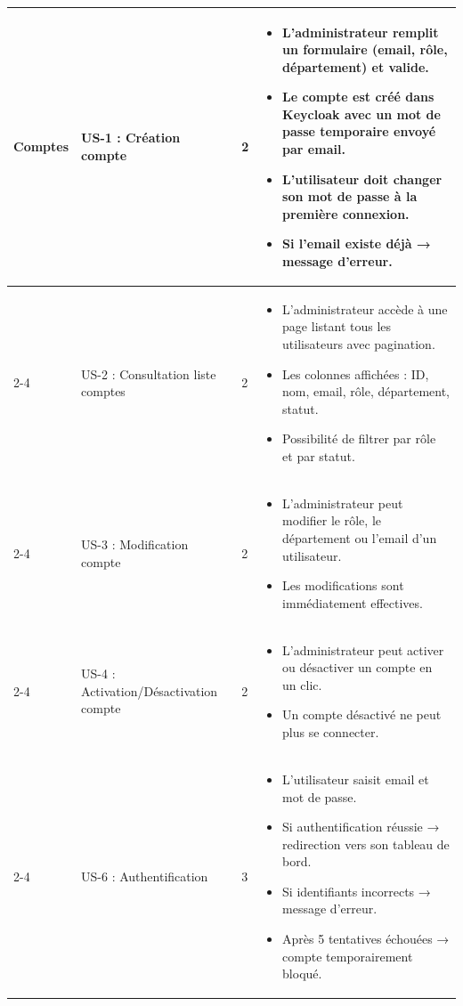 \documentclass[12pt,a4paper]{report}
\begin{document}
\begin{longtable}{|p{2.5cm}|p{3cm}|p{1.5cm}|p{8cm}|}
\multirow{5}{*}{Comptes} & US-1 :  Création compte & 2 & \begin{itemize}
 \item L’administrateur remplit un formulaire (email, rôle, département) et valide.
 \item Le compte est créé dans Keycloak avec un mot de passe temporaire envoyé par email.
 \item L’utilisateur doit changer son mot de passe à la première connexion.
 \item Si l’email existe déjà → message d’erreur.
\end{itemize} \\
\cline{2-4}
& US-2 : Consultation liste comptes & 2 & \begin{itemize}
 \item L’administrateur accède à une page listant tous les utilisateurs avec pagination.
 \item Les colonnes affichées : ID, nom, email, rôle, département, statut.
 \item Possibilité de filtrer par rôle et par statut.
\end{itemize} \\
\cline{2-4}
& US-3 : Modification compte & 2 & \begin{itemize}
 \item L’administrateur peut modifier le rôle, le département ou l’email d’un utilisateur.
 \item Les modifications sont immédiatement effectives.
\end{itemize} \\
\cline{2-4}
& US-4 : Activation/Désactivation compte & 2 & \begin{itemize}
 \item L’administrateur peut activer ou désactiver un compte en un clic.
 \item Un compte désactivé ne peut plus se connecter.
\end{itemize} \\
\cline{2-4}
& US-6 : Authentification & 3 & \begin{itemize}
 \item L’utilisateur saisit email et mot de passe.
 \item Si authentification réussie → redirection vers son tableau de bord.
 \item Si identifiants incorrects → message d’erreur.
 \item Après 5 tentatives échouées → compte temporairement bloqué.
\end{itemize} \\
\hline


\end{longtable}
\end{document}
